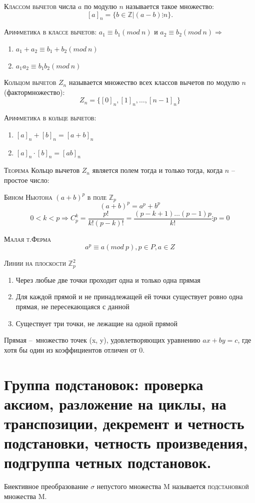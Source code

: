 \documentclass{article}
\begin{document}
\textsc{Классом вычетов} числа $a$ по модулю $n$ называется такое множество:
$$[a]_n=\{b\in \mathbb{Z}|(a-b)\vdots n\}.$$

\textsc{Арифметика в классе вычетов:}
$a_1\equiv b_1 (mod\ n)$ и $a_2\equiv b_2 (mod\ n)\Rightarrow$
\begin{enumerate}
    \item $a_1+a_2\equiv b_1+b_2 (mod\ n)$
    \item $a_1a_2\equiv b_1b_2 (mod\ n)$
\end{enumerate}

\textsc{Кольцом вычетов} $Z_n$ называется множество всех классов вычетов по модулю $n$ (фактормножество):
$$Z_n=\{[0]_n, [1]_n,\dots , [n-1]_n\}$$

\textsc{Арифметика в кольце вычетов:}
\begin{enumerate}
    \item $[a]_n+[b]_n=[a+b]_n$
    \item $[a]_n\cdot [b]_n=[ab]_n$
\end{enumerate}

\textsc{Теорема} Кольцо вычетов $Z_n$ является полем тогда и только тогда, когда $n$ – простое число:

\textsc{Бином Ньютона $(a+b)^p$ в поле $\mathbb{Z}_p$}
$$(a+b)^p=a^p+b^p$$
$$0<k<p\Rightarrow C^k_p=\frac{p!}{k!(p-k)!}=\frac{(p-k+1)\dots(p-1)p}{k!}\vdots p=0$$

\textsc{Малая т.Ферма}
$$a^p\equiv a (mod\ p), p\in P, a\in Z$$

\textsc{Линии на плоскости $\mathbb{Z}^2_p$}
\begin{enumerate}
    \item Через любые две точки проходит одна и только одна прямая
    \item Для каждой прямой и не принадлежащей ей точки существует ровно одна прямая, не пересекающаяся с данной
    \item Существует три точки, не лежащие на одной прямой
\end{enumerate}
Прямая – множество точек (x, y), удовлетворяющих уравнению $ax+by=c$, где хотя бы один из коэффициентов отличен от 0. 

\section{Группа подстановок: проверка аксиом, разложение на циклы, на транспозиции, декремент и четность подстановки, четность произведения, подгруппа четных подстановок.}
Биективное преобразование $\sigma$ непустого множества M называется \textsc{подстановкой} множества M.
\end{document}
